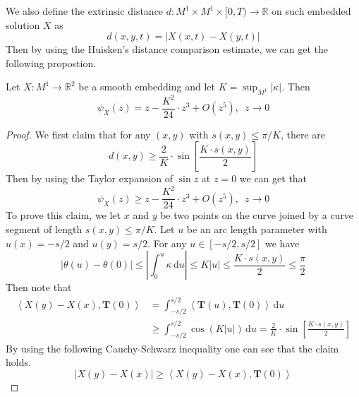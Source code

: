 We also define the extrinsic distance $d:M^1\times M^1\times [0,T)\to\mathbb{R}$ on such embedded solution $X$ as
\begin{equation*}
    d(x,y,t)=\left|X(x,t)-X(y,t)\right|
\end{equation*}
Then by using the Huisken's distance comparison estimate, we can get the following propostion.
\begin{proposition}\label{prop:I-2-2}
    Let $X:M^1\to\mathbb{R}^2$ be a smooth embedding and let $K=\sup_{M^1}\left|\kappa\right|$. Then
    \begin{equation}
        \psi_X(z)=z-\frac{K^2}{24}\cdot z^3+O(z^5),\,\,\, z\to 0
    \end{equation}
\end{proposition}
\begin{proof}
    We first claim that for any $(x,y)$ with $s(x,y)\le\pi/K$, there are
    \begin{equation*}
        d(x,y)\ge\frac{2}{K}\cdot\sin{\left[\frac{K\cdot s(x,y)}{2}\right]}
    \end{equation*}
    Then by using the Taylor expansion of $\sin{z}$ at $z=0$ we can get that
    \begin{equation*}
        \psi_X(z)\ge z-\frac{K^2}{24}\cdot z^3+O(z^5),\,\,\, z\to 0
    \end{equation*}
    To prove this claim, we let $x$ and $y$ be two points on the curve joined by a curve segment of length $s(x,y)\le\pi/K$. Let $u$ be an arc length parameter with $u(x)=-s/2$ and $u(y)=s/2$. For any $u\in\left[-s/2,s/2\right]$ we have
    \begin{equation*}
        \left|\theta(u)-\theta(0)\right|\le\left|\int_{0}^{u}\kappa\,\mathrm{d}u\right|\le K\left|u\right|\le\frac{K\cdot s(x,y)}{2}\le\frac{\pi}{2}
    \end{equation*}
    Then note that
    \begin{align*}
        \left<X(y)-X(x),\mathbf{T}(0)\right>&=\int_{-s/2}^{s/2}\left<\mathbf{T}(u),\mathbf{T}(0)\right>\,\mathrm{d}u\\
        &\ge\int_{-s/2}^{s/2}\cos{\left(K\left|u\right|\right)}\,\mathrm{d}u=\frac{2}{K}\cdot\sin{\left[\frac{K\cdot s(x,y)}{2}\right]}
    \end{align*}
    By using the following Cauchy-Schwarz inequality one can see that the claim holds.
    \begin{equation*}
        \left|X(y)-X(x)\right|\ge\left<X(y)-X(x),\mathbf{T}(0)\right>
    \end{equation*}
    

\end{proof}
